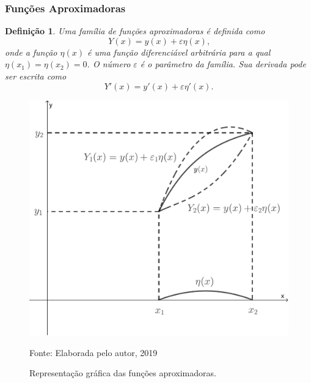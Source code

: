 \documentclass{beamer}
\newtheorem{definicao}{Definição}
\begin{document}
	\begin{frame}
		\frametitle{Funções Aproximadoras}
		\begin{definicao}
			\justify
			Uma família de funções aproximadoras é definida como
			$$Y(x)=y(x)+\varepsilon \eta (x)\text{,}$$
			onde a função $\eta (x)$ é uma função diferenciável arbitrária para a qual $\eta (x_1)=\eta (x_2)=0$. O número $\varepsilon$ é o parâmetro da família. Sua derivada pode ser escrita como
			$$Y'(x)=y'(x)+\varepsilon \eta '(x)\text{.}$$
		\end{definicao}
	\end{frame}

	\encapsulateBackgroundLessFrames
	{
		\begin{frame}
			\begin{figure}
				\caption{Representação gráfica das funções aproximadoras.}
				\begin{center}
					\includegraphics[scale=0.25]{../../figuras/cap_calcvar/figura_001}\par
					{\small Fonte: Elaborada pelo autor, 2019}
				\end{center}
				\label{fig:func_approx}
			\end{figure}
		\end{frame}
	}
	
\end{document}
